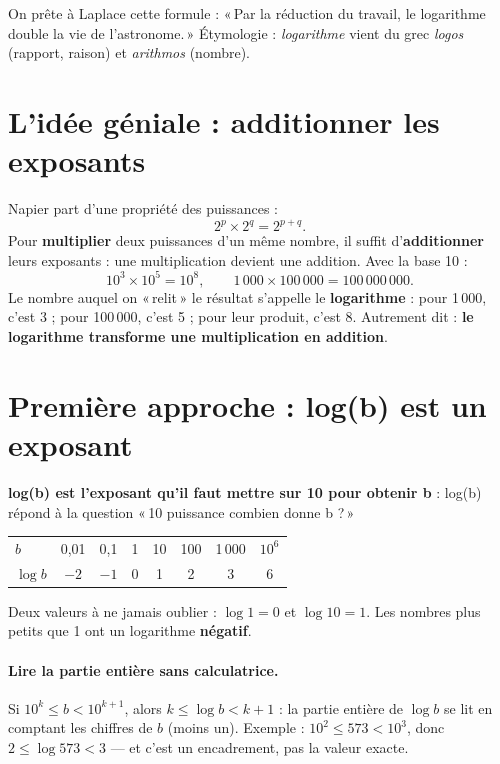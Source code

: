 \documentclass[11pt,a4paper]{article}
\begin{document}
On prête à Laplace cette formule : «\,Par la réduction du travail, le logarithme double la vie de l'astronome.\,» Étymologie : \emph{logarithme} vient du grec \emph{logos} (rapport, raison) et \emph{arithmos} (nombre).

\section{L'idée géniale : additionner les exposants}
Napier part d'une propriété des puissances :
\[ 2^{p} \times 2^{q} = 2^{p+q}. \]
Pour \textbf{multiplier} deux puissances d'un même nombre, il suffit d'\textbf{additionner} leurs exposants : une multiplication devient une addition. Avec la base 10 :
\[ 10^{3} \times 10^{5} = 10^{8}, \qquad 1\,000 \times 100\,000 = 100\,000\,000. \]
Le nombre auquel on «\,relit\,» le résultat s'appelle le \textbf{logarithme} : pour 1\,000, c'est 3 ; pour 100\,000, c'est 5 ; pour leur produit, c'est 8. Autrement dit : \textbf{le logarithme transforme une multiplication en addition}.

\section{Première approche : log(b) est un exposant}
\textbf{log(b) est l'exposant qu'il faut mettre sur 10 pour obtenir b} : log(b) répond à la question «\,10 puissance combien donne b ?\,»

\begin{center}
\begin{tabular}{lccccccc}
\toprule
$b$ & 0,01 & 0,1 & 1 & 10 & 100 & 1\,000 & $10^{6}$ \\
$\log b$ & $-2$ & $-1$ & 0 & 1 & 2 & 3 & 6 \\
\bottomrule
\end{tabular}
\end{center}

Deux valeurs à ne jamais oublier : $\log 1 = 0$ et $\log 10 = 1$. Les nombres plus petits que 1 ont un logarithme \textbf{négatif}.

\paragraph{Lire la partie entière sans calculatrice.}
Si $10^{k} \leqslant b < 10^{k+1}$, alors $k \leqslant \log b < k+1$ : la partie entière de $\log b$ se lit en comptant les chiffres de $b$ (moins un). Exemple : $10^{2} \leqslant 573 < 10^{3}$, donc $2 \leqslant \log 573 < 3$ --- et c'est un encadrement, pas la valeur exacte.
\end{document}
